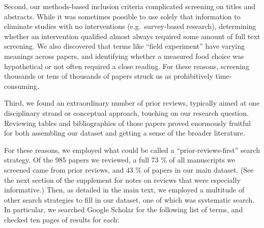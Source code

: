 \documentclass[sn-nature,referee,pdflatex]{sn-jnl}
\begin{document}
Second, our methods-based inclusion criteria complicated screening on
titles and abstracts. While it was sometimes possible to use solely that
information to eliminate studies with no interventions
(e.g.~survey-based research), determining whether an intervention
qualified almost always required some amount of full text screening. We
also discovered that terms like ``field experiment'' have varying
meanings across papers, and identifying whether a measured food choice
was hypothetical or not often required a close reading. For these
reasons, screening thousands or tens of thousands of papers struck us as
prohibitively time-consuming.

Third, we found an extraordinary number of prior reviews, typically
aimed at one disciplinary strand or conceptual approach, touching on our
research question. Reviewing tables and bibliographies of those papers
proved enormously fruitful for both assembling our dataset and getting a
sense of the broader literature.

For these reasons, we employed what could be called a
``prior-reviews-first'' search strategy. Of the 985 papers we reviewed,
a full 73 \% of all manuscripts we screened came from prior reviews, and
43 \% of papers in our main dataset. (See the next section of the
supplement for notes on reviews that were especially informative.) Then,
as detailed in the main text, we employed a multitude of other search
strategies to fill in our dataset, one of which was systematic search.
In particular, we searched Google Scholar for the following list of
terms, and checked ten pages of results for each:
\end{document}
